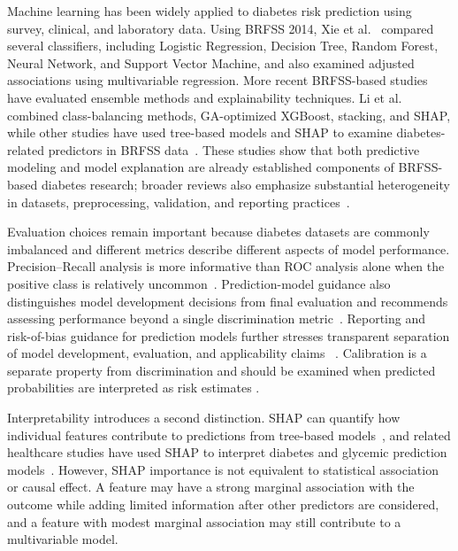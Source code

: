 \documentclass[pdflatex,sn-basic,Numbered]{sn-jnl}
\begin{document}
Machine learning has been widely applied to diabetes risk prediction using
survey, clinical, and laboratory data.
Using BRFSS 2014, Xie et al.~\citep{xie2019diabetes} compared several
classifiers, including Logistic Regression, Decision Tree, Random Forest,
Neural Network, and Support Vector Machine, and also examined adjusted
associations using multivariable regression.
More recent BRFSS-based studies have evaluated ensemble methods and
explainability techniques.
Li et al.~\citep{li2024gaxgboost} combined class-balancing methods,
GA-optimized XGBoost, stacking, and SHAP, while other studies have used
tree-based models and SHAP to examine diabetes-related predictors in BRFSS
data~\citep{majcherek2025aidriven,muhammad2025brfss}.
These studies show that both predictive modeling and model explanation are
already established components of BRFSS-based diabetes research; broader reviews
also emphasize substantial heterogeneity in datasets, preprocessing, validation,
and reporting practices~\citep{mohsen2023scoping}.

Evaluation choices remain important because diabetes datasets are commonly
imbalanced and different metrics describe different aspects of model
performance.
Precision--Recall analysis is more informative than ROC analysis alone when
the positive class is relatively uncommon~\citep{saito2015precisionrecall}.
Prediction-model guidance also distinguishes model development decisions
from final evaluation and recommends assessing performance beyond a single
discrimination metric~\citep{efthimiou2024developing,collins2024evaluation}.
Reporting and risk-of-bias guidance for prediction models further stresses transparent
separation of model development, evaluation, and applicability claims
~\citep{collins2024tripodai,moons2025probastai}.
Calibration is a separate property from discrimination and should be
examined when predicted probabilities are interpreted as risk estimates
\citep{huang2020calibration}.

Interpretability introduces a second distinction.
SHAP can quantify how individual features contribute to predictions from
tree-based models~\citep{lundberg2017unified,lundberg2020trees}, and related
healthcare studies have used SHAP to interpret diabetes and glycemic prediction
models~\citep{lugner2024predictors,prendin2023shap}. However, SHAP
importance is not equivalent to statistical association or causal effect.
A feature may have a strong marginal association with the outcome while
adding limited information after other predictors are considered, and a
feature with modest marginal association may still contribute to a
multivariable model.
\end{document}
